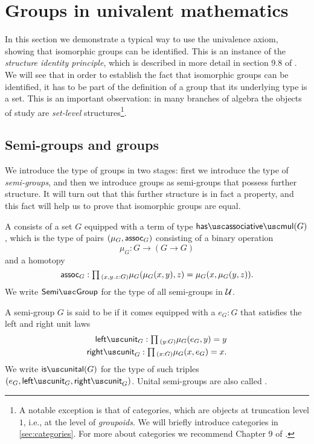 \section{Groups in univalent mathematics}

In this section we demonstrate a typical way to use the univalence axiom, showing that isomorphic groups can be identified.
This is an instance of the \emph{structure identity principle}, which is described in more detail in section 9.8 of \cite{hottbook}.
We will see that in order to establish the fact that isomorphic groups can be identified, it has to be part of the definition of a group that its underlying type is a set. This is an important observation: in many branches of algebra the objects of study are \emph{set-level} structures\footnote{A notable exception is that of categories, which are objects at truncation level $1$, i.e., at the level of \emph{groupoids}. We will briefly introduce categories in \cref{sec:categories}. For more about categories we recommend Chapter 9 of \cite{hottbook}.}.

\subsection{Semi-groups and groups}
We introduce the type of groups in two stages: first we introduce the type of \emph{semi-groups}, and then we introduce groups as semi-groups that possess further structure. It will turn out that this further structure is in fact a property, and this fact will help us to prove that isomorphic groups are equal.

\begin{defn}
  A  consists of a set $G$ equipped with a term of type $\hasassociativemul(G)$, which is the type of pairs $(\mu_G,\mathsf{assoc}_G)$ consisting of a binary operation
  \begin{equation*}
    \mu_G : G \to (G \to G)
  \end{equation*}
  and a homotopy
  \begin{equation*}
    \assoc_G : \prd{x,y.z:G}\mu_G(\mu_G(x,y),z)=\mu_G(x,\mu_G(y,z)).
  \end{equation*}
  We write $\semigroup$ for the type of all semi-groups in $\mathcal{U}$.
\end{defn}

\begin{defn}
  A semi-group $G$ is said to be  if it comes equipped with a  $e_G:G$ that satisfies the left and right unit laws
  \begin{align*}
    \leftunit_G : \prd{y:G}\mu_G(e_G,y)=y \\
    \rightunit_G : \prd{x:G}\mu_G(x,e_G)=x.
  \end{align*}
  We write $\isunital(G)$ for the type of such triples $(e_G,\leftunit_G,\rightunit_G)$. Unital semi-groups are also called .
\end{defn}

